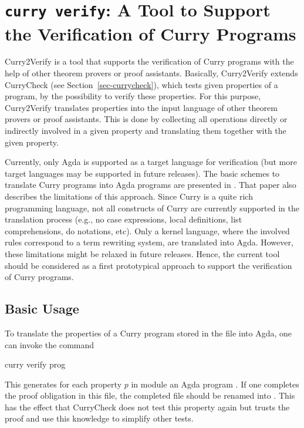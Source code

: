 \section{\texttt{curry verify}: A Tool to Support the Verification of Curry Programs}
\label{sec-curry2verify}

Curry2Verify
is a tool that supports the verification of Curry programs
with the help of other theorem provers or proof assistants.
Basically, Curry2Verify extends CurryCheck (see Section~\ref{sec-currycheck}),
which tests given properties of a program,
by the possibility to verify these properties.
For this purpose, Curry2Verify translates properties
into the input language of other theorem provers or proof assistants.
This is done by collecting all operations directly or indirectly
involved in a given property and translating them together with
the given property.

Currently, only Agda \cite{Norell09} is supported as
a target language for verification (but more target languages
may be supported in future releases).
The basic schemes to translate Curry programs into Agda programs
are presented in \cite{AntoyHanusLibby16}.
That paper also describes the limitations of this approach.
Since Curry is a quite rich programming language,
not all constructs of Curry are currently supported
in the translation process (e.g., no case expressions,
local definitions, list comprehensions, do notations, etc).
Only a kernel language, where the involved rules
correspond to a term rewriting system, are translated into Agda.
However, these limitations might be relaxed in future releases.
Hence, the current tool should be considered as a first prototypical
approach to support the verification of Curry programs.

\subsection{Basic Usage}

To translate the properties of a Curry program stored
in the file  into Agda,
one can invoke the command
%
\begin{curry}
curry verify prog
\end{curry}
%
This generates for each property $p$ in module 
an Agda program .
If one completes the proof obligation in this file,
the completed file should be renamed into
.
This has the effect that CurryCheck does not test this property again
but trusts the proof and use this knowledge to simplify other tests.

